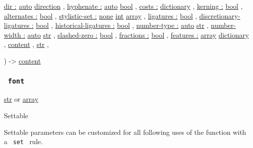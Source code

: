 {\hyperref[parameters-dir]{dir :}
\href{/docs/reference/foundations/auto/}{auto}
\href{/docs/reference/layout/direction/}{direction} , } {
\hyperref[parameters-hyphenate]{hyphenate :}
\href{/docs/reference/foundations/auto/}{auto}
\href{/docs/reference/foundations/bool/}{bool} , } {
\hyperref[parameters-costs]{costs :}
\href{/docs/reference/foundations/dictionary/}{dictionary} , } {
\hyperref[parameters-kerning]{kerning :}
\href{/docs/reference/foundations/bool/}{bool} , } {
\hyperref[parameters-alternates]{alternates :}
\href{/docs/reference/foundations/bool/}{bool} , } {
\hyperref[parameters-stylistic-set]{stylistic-set :}
\href{/docs/reference/foundations/none/}{none}
\href{/docs/reference/foundations/int/}{int}
\href{/docs/reference/foundations/array/}{array} , } {
\hyperref[parameters-ligatures]{ligatures :}
\href{/docs/reference/foundations/bool/}{bool} , } {
\hyperref[parameters-discretionary-ligatures]{discretionary-ligatures :}
\href{/docs/reference/foundations/bool/}{bool} , } {
\hyperref[parameters-historical-ligatures]{historical-ligatures :}
\href{/docs/reference/foundations/bool/}{bool} , } {
\hyperref[parameters-number-type]{number-type :}
\href{/docs/reference/foundations/auto/}{auto}
\href{/docs/reference/foundations/str/}{str} , } {
\hyperref[parameters-number-width]{number-width :}
\href{/docs/reference/foundations/auto/}{auto}
\href{/docs/reference/foundations/str/}{str} , } {
\hyperref[parameters-slashed-zero]{slashed-zero :}
\href{/docs/reference/foundations/bool/}{bool} , } {
\hyperref[parameters-fractions]{fractions :}
\href{/docs/reference/foundations/bool/}{bool} , } {
\hyperref[parameters-features]{features :}
\href{/docs/reference/foundations/array/}{array}
\href{/docs/reference/foundations/dictionary/}{dictionary} , } {
\href{/docs/reference/foundations/content/}{content} , } {
\href{/docs/reference/foundations/str/}{str} , }

) -\textgreater{} \href{/docs/reference/foundations/content/}{content}

\subsubsection{\texorpdfstring{\texttt{\ font\ }}{ font }}\label{parameters-font}

\href{/docs/reference/foundations/str/}{str} {or}
\href{/docs/reference/foundations/array/}{array}

{{ Settable }}

\label{parameters-font-settable-tooltip}
Settable parameters can be customized for all following uses of the
function with a \texttt{\ set\ } rule.

